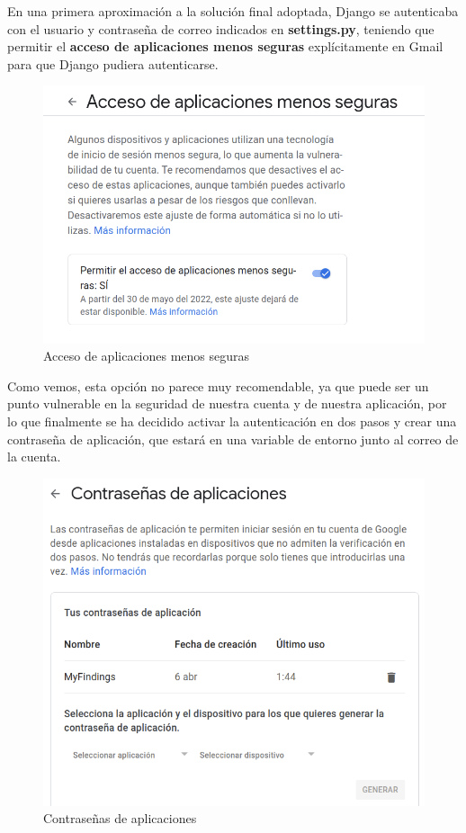 En una primera aproximación a la solución final adoptada, Django se autenticaba con el
usuario y contraseña de correo indicados en \textbf{settings.py}, teniendo que permitir
el \textbf{acceso de aplicaciones menos seguras} explícitamente en Gmail para que Django
pudiera autenticarse.

    \begin{figure}[H]
        \centering
        \includegraphics[scale=0.47]{imagenes/apps-access.png}
        \caption{Acceso de aplicaciones menos seguras}
        \label{fig:apps-access}
    \end{figure}

Como vemos, esta opción no parece muy recomendable, ya que puede ser un punto vulnerable
en la seguridad de nuestra cuenta y de nuestra aplicación, por lo que finalmente se ha
decidido activar la autenticación en dos pasos y crear una contraseña de aplicación,
que estará en una variable de entorno junto al correo de la cuenta.

    \begin{figure}[H]
        \centering
        \includegraphics[scale=0.50]{imagenes/apps-pass.png}
        \caption{Contraseñas de aplicaciones}
        \label{fig:apps-pass}
    \end{figure}

